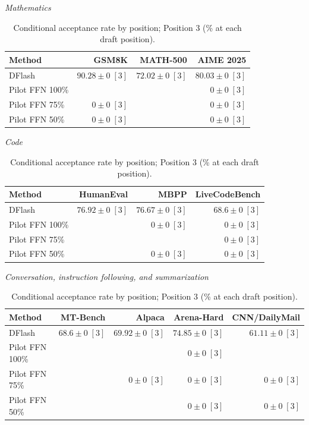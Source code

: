 \documentclass[conference,onecolumn]{IEEEtran}
\begin{document}
\begin{table}[!htp]
\centering\small
\setlength{\tabcolsep}{3pt}
\caption{Conditional acceptance rate by position; Position 3 (\% at each draft position).}
\label{tab:appendix-metric-conditional-acceptance-3}
\textit{Mathematics}\par\smallskip
\begin{tabular}{@{}>{\raggedright\arraybackslash}p{3.7cm}rrr@{}}
\toprule
Method & GSM8K & MATH-500 & AIME 2025 \\
\midrule
DFlash & \(\mathbf{90.28} \pm 0\;[3]\) & \(72.02 \pm 0\;[3]\) & \(\mathbf{80.03} \pm 0\;[3]\) \\
Pilot FFN 100\% &  &  & \(0 \pm 0\;[3]\) \\
Pilot FFN 75\% & \(0 \pm 0\;[3]\) &  & \(0 \pm 0\;[3]\) \\
Pilot FFN 50\% & \(0 \pm 0\;[3]\) &  & \(0 \pm 0\;[3]\) \\
\bottomrule
\end{tabular}\par\medskip
\textit{Code}\par\smallskip
\begin{tabular}{@{}>{\raggedright\arraybackslash}p{3.7cm}rrr@{}}
\toprule
Method & HumanEval & MBPP & LiveCodeBench \\
\midrule
DFlash & \(76.92 \pm 0\;[3]\) & \(\mathbf{76.67} \pm 0\;[3]\) & \(\mathbf{68.6} \pm 0\;[3]\) \\
Pilot FFN 100\% &  & \(0 \pm 0\;[3]\) & \(0 \pm 0\;[3]\) \\
Pilot FFN 75\% &  &  & \(0 \pm 0\;[3]\) \\
Pilot FFN 50\% &  & \(0 \pm 0\;[3]\) & \(0 \pm 0\;[3]\) \\
\bottomrule
\end{tabular}\par\medskip
\textit{Conversation, instruction following, and summarization}\par\smallskip
\begin{tabular}{@{}>{\raggedright\arraybackslash}p{3.7cm}rrrr@{}}
\toprule
Method & MT-Bench & Alpaca & Arena-Hard & CNN/DailyMail \\
\midrule
DFlash & \(68.6 \pm 0\;[3]\) & \(\mathbf{69.92} \pm 0\;[3]\) & \(\mathbf{74.85} \pm 0\;[3]\) & \(\mathbf{61.11} \pm 0\;[3]\) \\
Pilot FFN 100\% &  &  & \(0 \pm 0\;[3]\) &  \\
Pilot FFN 75\% &  & \(0 \pm 0\;[3]\) & \(0 \pm 0\;[3]\) & \(0 \pm 0\;[3]\) \\
Pilot FFN 50\% &  &  & \(0 \pm 0\;[3]\) & \(0 \pm 0\;[3]\) \\

\end{tabular}
\end{table}
\end{document}
